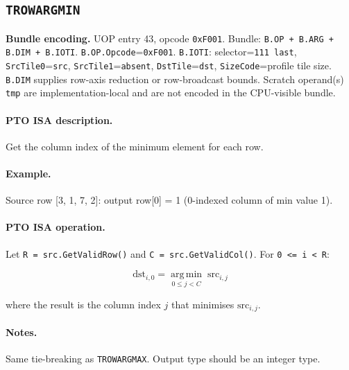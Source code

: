 \subsection{\texttt{TROWARGMIN}}
\noindent\textbf{Bundle encoding.} UOP entry 43, opcode \texttt{0xF001}. Bundle: \texttt{B.OP + B.ARG + B.DIM + B.IOTI}. \texttt{B.OP.Opcode}=\texttt{0xF001}. \texttt{B.IOTI}: selector=\texttt{111 last}, \texttt{SrcTile0}=\texttt{src}, \texttt{SrcTile1}=\texttt{absent}, \texttt{DstTile}=\texttt{dst}, \texttt{SizeCode}=profile tile size. \texttt{B.DIM} supplies row-axis reduction or row-broadcast bounds. Scratch operand(s) \texttt{tmp} are implementation-local and are not encoded in the CPU-visible bundle.\par\smallskip
{\small
\paragraph{PTO ISA description.}
Get the column index of the minimum element for each row.
\paragraph{Example.}
Source row [3, 1, 7, 2]: output row[0] = 1 (0-indexed column of min value 1).
\par\smallskip
\paragraph{PTO ISA operation.}
Let \texttt{R = src.GetValidRow()} and \texttt{C = src.GetValidCol()}. For \texttt{0 \textless{}= i \textless{} R}:

\[
\mathrm{dst}_{i,0} = \operatorname*{arg\,min}_{0 \le j < C}\; \mathrm{src}_{i,j}
\]

\noindent where the result is the column index $j$ that minimises $\mathrm{src}_{i,j}$.
}\par\smallskip
\paragraph{Notes.}
Same tie-breaking as \texttt{TROWARGMAX}. Output type should be an integer type.
